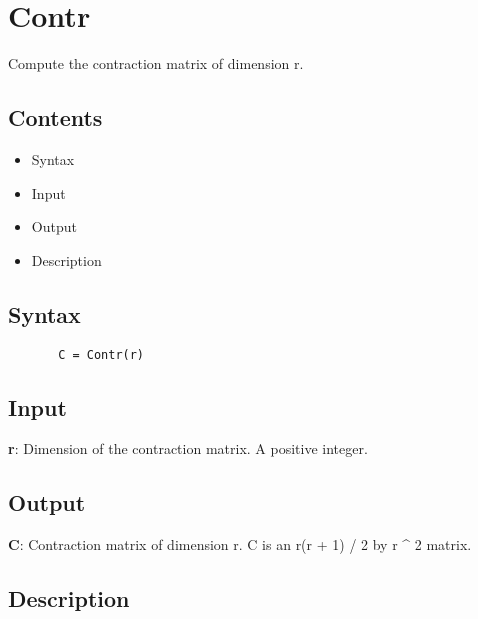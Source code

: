 \documentclass[a4paper,11pt,openany]{memoir}
\begin{document}
\newpage

\rmfamily
\color{black}\section{Contr}

\begin{par}
Compute the contraction matrix of dimension r.
\end{par} \vspace{1em}

\subsection*{Contents}

\begin{itemize}
\setlength{\itemsep}{-1ex}
   \item Syntax
   \item Input
   \item Output
   \item Description
\end{itemize}


\subsection*{Syntax}


\begin{verbatim}       C = Contr(r)\end{verbatim}
    

\subsection*{Input}

\begin{par}
\textbf{r}: Dimension of the contraction matrix.  A positive integer.
\end{par} \vspace{1em}


\subsection*{Output}

\begin{par}
\textbf{C}: Contraction matrix of dimension r.  C is an r(r + 1) / 2 by r \^{} 2 matrix.
\end{par} \vspace{1em}


\subsection*{Description}
\end{document}
